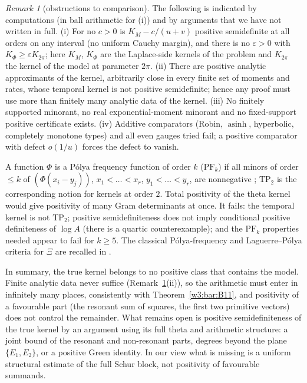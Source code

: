 \documentclass[11pt]{amsart}
\theoremstyle{definition}
\theoremstyle{remark}
\newtheorem{remark}[theorem]{Remark}
\numberwithin{equation}{section}
\begin{document}
\begin{remark}[obstructions to comparison]\label{w5:obs:kernelbar}
The following is indicated by computations (in ball arithmetic for (i)) and by arguments that we have not written in
full. (i) For no $c>0$ is $K_M-c/(u+v)$ positive semidefinite at all orders on any interval (no uniform Cauchy margin), and there
is no $\varepsilon>0$ with $K_\Phi\ge\varepsilon K_{2\pi}$; here $K_M$, $K_\Phi$ are the
Laplace-side kernels of the problem and $K_{2\pi}$ the kernel of the model at parameter $2\pi$. (ii) There are positive
analytic approximants of the kernel, arbitrarily close in every finite set of moments and rates, whose temporal kernel is
not positive semidefinite; hence any proof must use more than finitely many analytic data of the kernel.
(iii) No finitely supported minorant, no real exponential-moment minorant and no fixed-support positive certificate
exists. (iv) Additive comparators (Robin, $\operatorname{asinh}$, hyperbolic, completely monotone types) and all even gauges
tried fail; a positive comparator with defect $o(1/u)$ forces the defect to vanish.
\end{remark}

A function $\Phi$ is a P\'olya frequency function of order $k$ ($\mathrm{PF}_k$) if all minors of order $\le k$ of
$(\Phi(x_i-y_j))$, $x_1<\dots<x_r$, $y_1<\dots<y_r$, are nonnegative \cite{Schoenberg1951}; $\mathrm{TP}_2$ is the
corresponding notion for kernels at order $2$. Total positivity of the theta kernel would give positivity of many Gram
determinants at once. It fails: the temporal kernel is not $\mathrm{TP}_2$; positive semidefiniteness does not imply
conditional positive definiteness of $\log A$ (there is a quartic counterexample); and the $\mathrm{PF}_k$ properties
needed appear to fail for $k\ge5$. The classical P\'olya-frequency and Laguerre--P\'olya criteria for $\Xi$ are recalled
in \cite{P14}.

In summary, the true kernel belongs to no positive class that contains the model. Finite analytic data never suffice
(Remark~\ref{w5:obs:kernelbar}(ii)), so the arithmetic must enter in infinitely many places, consistently with
Theorem~\ref{w3:bar:B11}, and positivity of a favourable part (the resonant sum of squares, the first two primitive
vectors) does not control the remainder. What remains open is positive semidefiniteness of the true kernel by an
argument using its full theta and arithmetic structure: a joint bound of the resonant and non-resonant parts, degrees
beyond the plane $\{E_1,E_2\}$, or a positive Green identity. In our view what is missing is a uniform structural
estimate of the full Schur block, not positivity of favourable summands.
\end{document}
